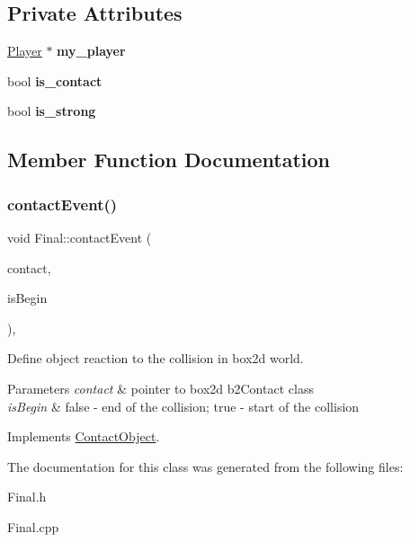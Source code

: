 \subsection*{Private Attributes}
\begin{DoxyCompactItemize}
\item 
\mbox{\label{class_final_ac09c1e5af1c2317a59fd2bdac39aac9f}} 
\hyperlink{class_player}{Player} $\ast$ {\bfseries my\+\_\+player}
\item 
\mbox{\label{class_final_a637485b836c9226c062c92a34e0a679d}} 
bool {\bfseries is\+\_\+contact}
\item 
\mbox{\label{class_final_a4beb08f8f72e6339e8544ae121fb717d}} 
bool {\bfseries is\+\_\+strong}
\end{DoxyCompactItemize}


\subsection{Member Function Documentation}
\mbox{\label{class_final_a9ebc21296dd28e993f2ee8cbb47a3b37}} 
\subsubsection{\texorpdfstring{contact\+Event()}{contactEvent()}}
{\footnotesize\ttfamily void Final\+::contact\+Event (\begin{DoxyParamCaption}\item[{b2\+Contact $\ast$}]{contact,  }\item[{bool}]{is\+Begin }\end{DoxyParamCaption})\hspace{0.3cm}{\ttfamily [private]}, {\ttfamily [virtual]}}



Define object reaction to the collision in box2d world. 


\begin{DoxyParams}{Parameters}
{\em contact} & pointer to box2d b2\+Contact class \\
\hline
{\em is\+Begin} & \textquotesingle{}false\textquotesingle{} -\/ end of the collision; \textquotesingle{}true\textquotesingle{} -\/ start of the collision \\
\hline
\end{DoxyParams}


Implements \hyperlink{class_contact_object_a53d2dfc1d9c2821e9c62e80ce62a6435}{Contact\+Object}.



The documentation for this class was generated from the following files\+:\begin{DoxyCompactItemize}
\item 
Final.\+h\item 
Final.\+cpp\end{DoxyCompactItemize}
